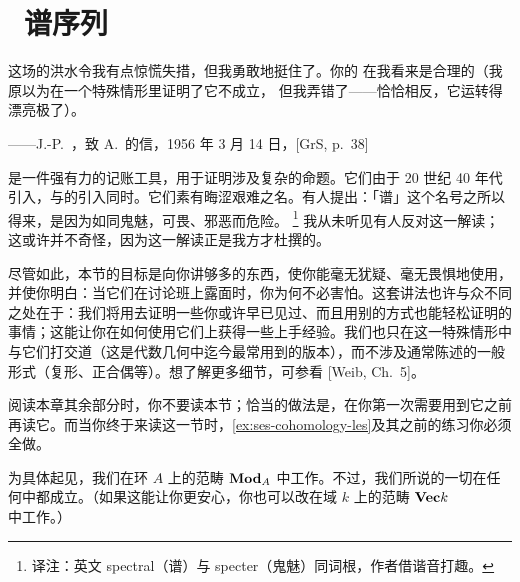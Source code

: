 \section{\hard\ 谱序列}

\epigraph
  {这场\trCohomology{}的洪水令我有点惊慌失措，但我勇敢地挺住了。你的%
   \trSpectralSequence{}在我看来是合理的（我原以为在一个特殊情形里证明了它不成立，
   但我弄错了——恰恰相反，它运转得漂亮极了）。}
  {——J.-P.~\trSerre，致 A.~\trGrothendieck{}的信，1956 年 3 月 14 日，[GrS, p.~38]}

\trSpectralSequence{}是一件强有力的记账工具，用于证明涉及复杂\trCommutativeDiagram{}的命题。它们由\trLeray{}于 20 世纪 40 年代引入，与\trSheaf{}的引入同时。它们素有晦涩艰难之名。有人提出：「谱」这个名号之所以得来，是因为\trSpectralSequence{}如同鬼魅，可畏、邪恶而危险。%
\footnote{译注：英文 spectral（谱）与 specter（鬼魅）同词根，作者借谐音打趣。}
我从未听见有人反对这一解读；这或许并不奇怪，因为这一解读正是我方才杜撰的。

尽管如此，本节的目标是向你讲够多的东西，使你能毫无犹疑、毫无畏惧地使用\trSpectralSequence，并使你明白：当它们在讨论班上露面时，你为何不必害怕。这套讲法也许与众不同之处在于：我们将用\trSpectralSequence{}去证明一些你或许早已见过、而且用别的方式也能轻松证明的事情；这能让你在如何使用它们上获得一些上手经验。我们也只在\trDoubleComplex{}这一特殊情形中与它们打交道（这是代数几何中迄今最常用到的版本），而不涉及通常陈述的一般形式（\trFiltered{}复形、正合偶等）。想了解更多细节，可参看 [Weib, Ch.~5]。

阅读本章其余部分时，你不要读本节；恰当的做法是，在你第一次需要用到它之前再读它。而当你终于来读这一节时，\cref{ex:ses-cohomology-les}及其之前的练习你必须全做。

为具体起见，我们在环 $A$ 上\trModule{}的范畴 $\mathbf{Mod}_{A}$ 中工作。不过，我们所说的一切在任何\trAbelianCategory{}中都成立。（如果这能让你更安心，你也可以改在域 $k$ 上\trVectorSpace{}的范畴 $\mathbf{Vec}{k}$ 中工作。）

